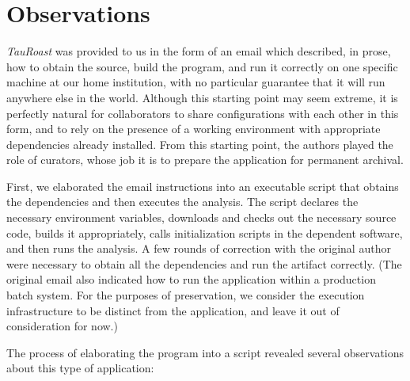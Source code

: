 \documentclass{sig-alternate}
\begin{document}
\section{Observations}

\emph{TauRoast} was provided to us in the form of an
email which described, in prose, how to obtain the source,
build the program, and run it correctly on one specific
machine at our home institution, with no particular guarantee that
it will run anywhere else in the world.
Although this starting point may seem extreme, it is
perfectly natural for collaborators to share configurations
with each other in this form, and to rely on the presence
of a working environment with appropriate dependencies already
installed.  From this starting point, the authors played the
role of curators, whose job it is to prepare the application
for permanent archival.

First, we elaborated the email instructions into an
executable script that obtains the dependencies and then
executes the analysis.  The script declares the necessary
environment variables, downloads and checks out the necessary source code,
builds it appropriately, calls initialization scripts in
the dependent software, and then runs the analysis.
A few rounds of correction with the original author were necessary
to obtain all the dependencies and run the artifact correctly.
(The original email also indicated how to run the application
within a production batch system.  For the purposes of preservation,
we consider the execution infrastructure to be distinct from the application,
and leave it out of consideration for now.)

The process of elaborating the program into a script revealed
several observations about this type of application:
\end{document}
